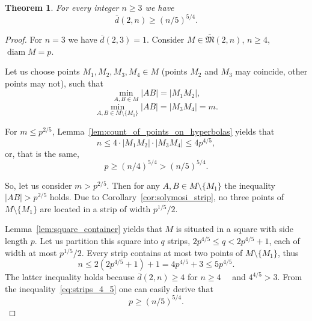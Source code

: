 \documentclass[a4paper,14pt]{article} %
\theoremstyle{plain}
\newtheorem{theorem}{Theorem}[section]
\theoremstyle{definition}
\begin{document}
\begin{theorem}
	\label{thm:main_result}
	For every integer $n \geq 3$ we have
	\begin{equation}
		\overline{d}(2,n) \geq (n/5)^{5/4}
		.
	\end{equation}
\end{theorem}

\begin{proof}
	For $n = 3$ we have $\overline{d}(2,3) = 1$.
	Consider $M\in\overline{\mathfrak{M}}(2,n)$, $n \geq 4$, $\operatorname{diam} M = p$.

	Let us choose points $M_1, M_2, M_3, M_4 \in M$
	(points $M_2$ and $M_3$ may coincide, other points may not), such that
	\begin{equation}
		\min_{A, B \in M} |AB| = |M_1 M_2|
		,
	\end{equation}
	\begin{equation}
		\min_{A, B \in M \setminus \{M_1\}} |AB| = |M_3 M_4| = m
		.
	\end{equation}

	For $m \leq p^{2/5}$, Lemma~\ref{lem:count_of_points_on_hyperbolas} yields that
	\begin{equation}
		n \leq 4 \cdot |M_1 M_2| \cdot |M_3 M_4| \leq  4 p^{4/5}
		,
	\end{equation}
	or, that is the same,
	\begin{equation}
		\label{eq:hyperbolas_5_4}
		p \geq (n/4) ^ {5/4} > (n/5) ^ {5/4}
		.
	\end{equation}

	So, let us consider $m > p^{2/5}$.
	Then for any $A,B \in M\setminus\{M_1\}$ the inequality $|AB| > p^{2/5}$ holds.
	Due to Corollary~\ref{cor:solymosi_strip}, no three points of $M\setminus\{M_1\}$
	are located in a strip of width $p^{1/5} / 2$.



	Lemma~\ref{lem:square_container} yields that $M$ is situated in a square with side length $p$.
	Let us partition this square into $q$ strips, $2p^{4/5} \leq q < 2p^{4/5} + 1$, each of width at most $p^{1/5} / 2$.
	Every strip contains at most two points of  $M\setminus\{M_1\}$,
	thus
	\begin{equation}
		\label{eq:strips_4_5}
		n \leq 2(2p^{4/5} + 1) + 1
		= 4p^{4/5}+3
		\leq 5 p^{4/5}
		.
	\end{equation}
	The latter inequality holds because $\overline{d}(2,n) \geq 4$ for $n\geq 4$~~\cite{kurz2008minimum}
	and $4^{4/5}>3$.
	From the inequality~\eqref{eq:strips_4_5} one can easily derive that
	\begin{equation}
		\label{eq:strips_5_4}
		p \geq (n/5) ^ {5/4}
		.
	\end{equation}
\end{proof}
\end{document}
